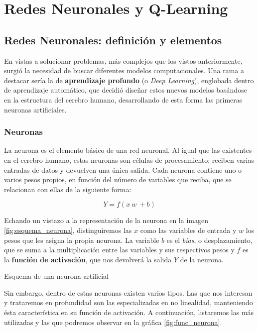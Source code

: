 \chapter{Redes Neuronales y Q-Learning}
\label{cap:deepLearning}


\section{Redes Neuronales: definición y elementos}
En vistas a solucionar problemas, más complejos que los vistos anteriormente, surgió la necesidad de buscar diferentes modelos computacionales. Una rama a destacar sería la de \textbf{aprendizaje profundo} (o \textit{Deep Learning}), englobada dentro de aprendizaje automático, que decidió diseñar estos nuevos modelos basándose en la estructura del cerebro humano, desarrollando de esta forma las primeras neuronas artificiales.

\subsection{Neuronas}
La neurona es el elemento básico de una red neuronal. Al igual que las existentes en el cerebro humano, estas neuronas son células de procesamiento; reciben varias entradas de datos y devuelven una única salida. Cada neurona contiene uno o varios pesos propios, en función del número de variables que reciba, que se relacionan con ellas de la siguiente forma:

$$Y = f(x\ w\ + b)$$

Echando un vistazo a la representación de la neurona en la imagen \ref{fig:esquema_neurona}, distinguiremos las $x$ como las variables de entrada y $w$ los pesos que les asigna la propia neurona. La variable $b$ es el \textit{bias}, o desplazamiento, que se suma a la multiplicación entre las variables y sus respectivos pesos y $f$ es la \textbf{función de activación}, que nos devolverá la salida $Y$ de la neurona.

%
       {Esquema de una neurona artificial}

Sin embargo, dentro de estas neuronas existen varios tipos. Las que nos interesan y trataremos en profundidad son las especializadas en no linealidad, manteniendo ésta característica en su función de activación. A continuación, listaremos las más utilizadas y las que podremos observar en la gráfica \ref{fig:func_neurona}.

